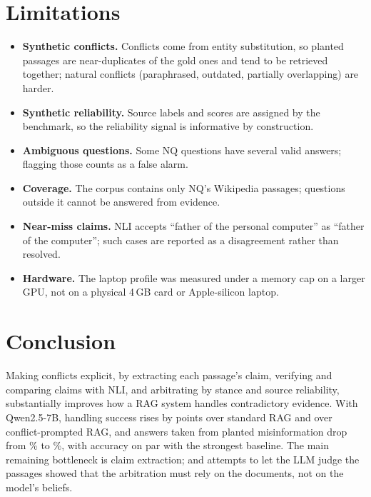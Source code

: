 \documentclass[11pt]{article}
\begin{document}
\section{Limitations}
\begin{itemize}
  \item \textbf{Synthetic conflicts.} Conflicts come from entity substitution, so planted passages
        are near-duplicates of the gold ones and tend to be retrieved together; natural conflicts
        (paraphrased, outdated, partially overlapping) are harder.
  \item \textbf{Synthetic reliability.} Source labels and scores are assigned by the benchmark, so the
        reliability signal is informative by construction.
  \item \textbf{Ambiguous questions.} Some NQ questions have several valid answers; flagging those
        counts as a false alarm.
  \item \textbf{Coverage.} The corpus contains only NQ's Wikipedia passages; questions outside it
        cannot be answered from evidence.
  \item \textbf{Near-miss claims.} NLI accepts ``father of the personal computer'' as
        ``father of the computer''; such cases are reported as a disagreement rather than resolved.
  \item \textbf{Hardware.} The laptop profile was measured under a memory cap on a larger GPU, not on
        a physical 4\,GB card or Apple-silicon laptop.
\end{itemize}

\section{Conclusion}
Making conflicts explicit, by extracting each passage's claim, verifying and comparing claims with
NLI, and arbitrating by stance and source reliability, substantially improves how a RAG system
handles contradictory evidence. With Qwen2.5-7B, handling success rises by
 points over standard RAG and  over
conflict-prompted RAG, and answers taken from planted misinformation drop from
\% to \%, with accuracy on par with the strongest
baseline. The main remaining
bottleneck is claim extraction; and attempts to let the LLM judge the passages showed that the
arbitration must rely on the documents, not on the model's beliefs.

\appendix
\end{document}
